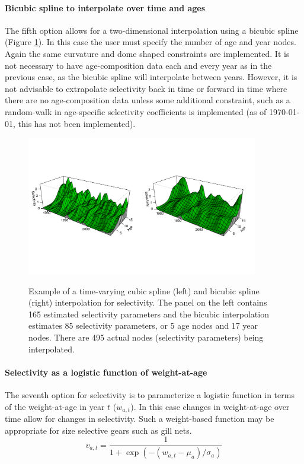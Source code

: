 \paragraph{Bicubic spline to interpolate over time and ages}  The fifth option allows for a two-dimensional interpolation using a bicubic spline (Figure \ref{Fig3}).  In this case the user must specify the number of age and year nodes.  Again the same curvature and dome shaped constraints are implemented.  It is not necessary to have age-composition data each and every year as in the previous case, as the bicubic spline will interpolate between years.  However, it is not advisable to extrapolate selectivity back in time or forward in time where there are no age-composition data unless some additional constraint, such as a random-walk in age-specific selectivity coefficients is implemented (as of \today, this has not been implemented).

\begin{figure}[!tbp]
	\centering
	\includegraphics[width=0.9\textwidth]{../Figs/BicubicEg.pdf}\\
	\caption{Example of a time-varying cubic spline (left) and bicubic spline (right) interpolation for selectivity. The panel on the left contains 165 estimated selectivity parameters and the bicubic interpolation estimates 85 selectivity parameters, or 5 age nodes and 17 year nodes. There are 495 actual nodes (selectivity parameters) being interpolated.}\label{Fig3}
\end{figure}


\paragraph{Selectivity as a logistic function of weight-at-age}

The seventh option for selectivity is to parameterize a logistic function in terms of the weight-at-age in year $t$ ($w_{a,t}$). In this case changes in weight-at-age over time allow for changes in selectivity. Such a weight-based function may be appropriate for size selective gears such as gill nets. 
\[
v_{a,t} = \frac{1}{1+ \exp{(-(w_{a,t}-\mu_{a})/\sigma_a)}}
\]

